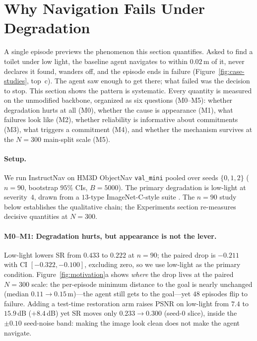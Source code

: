 \section{Why Navigation Fails Under Degradation}
\label{sec:motivation}

A single episode previews the phenomenon this section quantifies. Asked to
find a toilet under low light, the baseline agent navigates to within
$0.02$\,m of it, never declares it found, wanders off, and the episode ends
in failure (Figure~\ref{fig:case-studies}, top~c). The agent saw enough
to get there; what failed was the decision to stop. This section shows the
pattern is systematic. Every quantity is measured on the unmodified
backbone, organized as six questions (M0--M5): whether degradation hurts
at all (M0), whether the cause is appearance (M1), what failures look
like (M2), whether reliability is informative about commitments (M3),
what triggers a commitment (M4), and whether the mechanism survives at
the $N{=}300$ main-split scale (M5).

\paragraph{Setup.}
We run InstructNav on HM3D ObjectNav \texttt{val\_mini} pooled over seeds
$\{0,1,2\}$ ($n{=}90$, bootstrap $95\%$ CIs, $B{=}5000$). The primary
degradation is low-light at severity~$4$, drawn from a $13$-type
ImageNet-C-style suite \citep{hendrycks2019benchmarking}. The $n{=}90$
study below establishes the qualitative chain; the Experiments section
re-measures decisive quantities at $N{=}300$.

\paragraph{M0--M1: Degradation hurts, but appearance is not the lever.}
Low-light lowers SR from $0.433$ to $0.222$ at $n{=}90$; the paired drop is
$-0.211$ with CI $[-0.322, -0.100]$, excluding zero, so we use low-light as
the primary condition. Figure~\ref{fig:motivation}a shows \emph{where} the drop
lives at the paired $N{=}300$ scale: the per-episode minimum distance to
the goal is nearly unchanged (median $0.11\to0.15$\,m)---the agent still
gets to the goal---yet $48$ episodes flip to failure. Adding a test-time
restoration arm raises PSNR on
low-light from $7.4$ to $15.9$\,dB ($+8.4$\,dB) yet SR moves only $0.233
\to 0.300$ (seed-$0$ slice), inside the $\pm0.10$ seed-noise band:
making the image look clean does not make the agent navigate.

